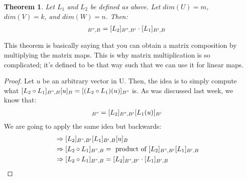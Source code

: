 \documentclass[a4paper, 12pt]{article}
\newtheorem{theorem}{Theorem}
\theoremstyle{definition}
\theoremstyle{definition}
\theoremstyle{definition}
\theoremstyle{definition}
\begin{document}
{\begin{theorem}
	Let $L_1$ and $L_2$ be defined as above. Let $dim(U) = m$, $dim(V) = k$, and $dim(W) = n$. Then: 
	\begin{align*}
		[L_2 \circ L_1 ]_{B", B} = [L_2]_{B",B'} \cdot [L_1]_{B',B} 
	\end{align*}
\end{theorem}
This theorem is basically saying that you can obtain a matrix composition by multiplying the matrix maps. This is why matrix multiplication is so complicated; it's defined to be that way such that we can use it for linear maps. 
\begin{proof}
	Let $u$ be an arbitrary vector in U. Then, the idea is to simply compute what $[L_2 \circ L_1]_{B", B} [u]_B = [(L_2 \circ L_1)(u)]_{B"}$ is. As was discussed last week, we know that: 
	\begin{align*}
		[L_2(L_1(u))]_{B"} = [L_2]_{B", B'}[L_1(u)]_{B'}
	\end{align*}
	We are going to apply the same idea but backwards: 
	\begin{align*}
		& \Rightarrow [L_2]_{B", B'} [L_1]_{B',B}[u]_B \\
		& \Rightarrow [L_2 \circ L_1]_{B", B} = \mbox{ product of } [L_2]_{B",B'}[L_1]_{B',B} \\
		& \Rightarrow [L_2 \circ L_1]_{B", B} = [L_2]_{B", B'} \cdot [L_1]_{B', B} 
	\end{align*}
\end{proof}

}
\end{document}
